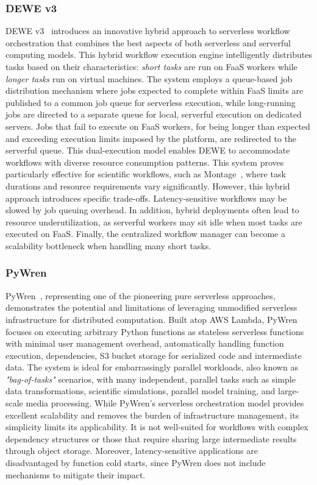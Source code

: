 \documentclass[conference]{IEEEtran}
\begin{document}
\subsubsection{DEWE v3}
DEWE v3~\cite{dewe_v3} introduces an innovative hybrid approach to serverless workflow orchestration that combines the best aspects of both serverless and serverful computing models. This hybrid workflow execution engine intelligently distributes tasks based on their characteristics: \textit{short tasks} are run on FaaS workers while \textit{longer tasks} run on virtual machines. The system employs a queue-based job distribution mechanism where jobs expected to complete within FaaS limits are published to a common job queue for serverless execution, while long-running jobs are directed to a separate queue for local, serverful execution on dedicated servers. Jobs that fail to execute on FaaS workers, for being longer than expected and exceeding execution limits imposed by the platform, are redirected to the serverful queue. This dual-execution model enables DEWE to accommodate workflows with diverse resource consumption patterns. This system proves particularly effective for scientific workflows, such as Montage~\cite{montage_astronomy}, where task durations and resource requirements vary significantly. However, this hybrid approach introduces specific trade-offs. Latency-sensitive workflows may be slowed by job queuing overhead. In addition, hybrid deployments often lead to resource underutilization, as serverful workers may sit idle when most tasks are executed on FaaS. Finally, the centralized workflow manager can become a scalability bottleneck when handling many short tasks.

\subsubsection{PyWren}
PyWren~\cite{pywren}, representing one of the pioneering pure serverless approaches, demonstrates the potential and limitations of leveraging unmodified serverless infrastructure for distributed computation. Built atop AWS Lambda, PyWren focuses on executing arbitrary Python functions as stateless serverless functions with minimal user management overhead, automatically handling function execution, dependencies, S3 bucket storage for serialized code and intermediate data. The system is ideal for embarrassingly parallel workloads, also known as \textit{"bag-of-tasks"} scenarios, with many independent, parallel tasks such as simple data transformations, scientific simulations, parallel model training, and large-scale media processing. While PyWren’s serverless orchestration model provides excellent scalability and removes the burden of infrastructure management, its simplicity limits its applicability. It is not well-suited for workflows with complex dependency structures or those that require sharing large intermediate results through object storage. Moreover, latency-sensitive applications are disadvantaged by function cold starts, since PyWren does not include mechanisms to mitigate their impact.
\end{document}
